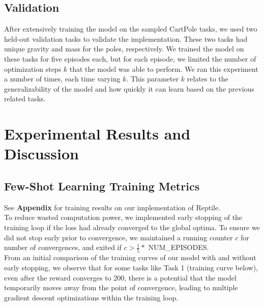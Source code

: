 \documentclass[runningheads]{llncs}
\begin{document}
\subsection{Validation}
After extensively training the model on the sampled CartPole tasks, we used two held-out validation tasks to validate the implementation. These two tasks had unique gravity and mass for the poles, respectively. We trained the model on these tasks for five episodes each, but for each episode, we limited the number of optimization steps $k$ that the model was able to perform. We ran this experiment a number of times, each time varying $k$. This parameter $k$ relates to the generalizability of the model and how quickly it can learn based on the previous related tasks. 

\section{Experimental Results and Discussion}

\subsection{Few-Shot Learning Training Metrics}
See \textbf{Appendix} for training results on our implementation of Reptile. \\ 

To reduce wasted computation power, we implemented early stopping of the training loop if the loss had already converged to the global optima. To ensure we did not stop early prior to convergence, we maintained a running counter $c$ for number of convergences, and exited if $c > \frac{1}{5} * $ NUM\_EPISODES. \\

From an initial comparison of the training curves of our model with and without early stopping, we observe that for some tasks like Task 1 (training curve below), even after the reward converges to 200, there is a potential that the model temporarily moves away from the point of convergence, leading to multiple gradient descent optimizations within the training loop. 
   
\end{document}
